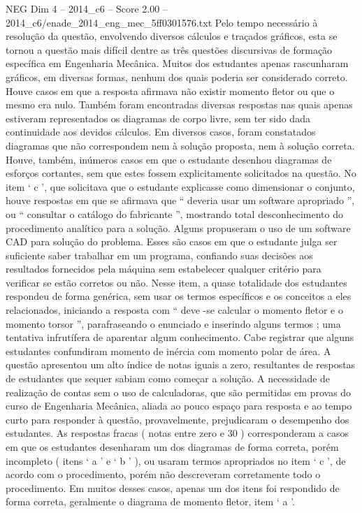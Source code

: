 \begin{textsample}{NEG Dim 4 – 2014\_c6 – Score 2.00 – 2014\_c6/enade\_2014\_eng\_mec\_5ff0301576.txt}
Pelo tempo necessário à resolução da questão, envolvendo diversos cálculos e traçados gráficos, esta se tornou a questão mais difícil dentre as três questões discursivas de formação específica em Engenharia Mecânica.
Muitos dos estudantes apenas rascunharam gráficos, em diversas formas, nenhum dos quais poderia ser considerado correto.
Houve casos em que a resposta afirmava não existir momento fletor ou que o mesmo era nulo.
Também foram encontradas diversas respostas nas quais apenas estiveram representados os diagramas de corpo livre, sem ter sido dada continuidade aos devidos cálculos.
Em diversos casos, foram constatados diagramas que não correspondem nem à solução proposta, nem à solução correta.
Houve, também, inúmeros casos em que o estudante desenhou diagramas de esforços cortantes, sem que estes fossem explicitamente solicitados na questão.
No item ‘ c ’, que solicitava que o estudante explicasse como dimensionar o conjunto, houve respostas em que se afirmava que “ deveria usar um software apropriado ”, ou “ consultar o catálogo do fabricante ”, mostrando total desconhecimento do procedimento analítico para a solução.
Alguns propuseram o uso de um software CAD para solução do problema.
Esses são casos em que o estudante julga ser suficiente saber trabalhar em um programa, confiando suas decisões aos resultados fornecidos pela máquina sem estabelecer qualquer critério para verificar se estão corretos ou não.
Nesse item, a quase totalidade dos estudantes respondeu de forma genérica, sem usar os termos específicos e os conceitos a eles relacionados, iniciando a resposta com “ deve -se calcular o momento fletor e o momento torsor ”, parafraseando o enunciado e inserindo alguns termos ; uma tentativa infrutífera de aparentar algum conhecimento.
Cabe registrar que alguns estudantes confundiram momento de inércia com momento polar de área.
A questão apresentou um alto índice de notas iguais a zero, resultantes de respostas de estudantes que sequer sabiam como começar a solução.
A necessidade de realização de contas sem o uso de calculadoras, que são permitidas em provas do curso de Engenharia Mecânica, aliada ao pouco espaço para resposta e ao tempo curto para responder à questão, provavelmente, prejudicaram o desempenho dos estudantes.
As respostas fracas ( notas entre zero e 30 ) corresponderam a casos em que os estudantes desenharam um dos diagramas de forma correta, porém incompleto ( itens ‘ a ’ e ‘ b ’ ), ou usaram termos apropriados no item ‘ c ’, de acordo com o procedimento, porém não descreveram corretamente todo o procedimento.
Em muitos desses casos, apenas um dos itens foi respondido de forma correta, geralmente o diagrama de momento fletor, item ‘ a ’.

\end{textsample}
